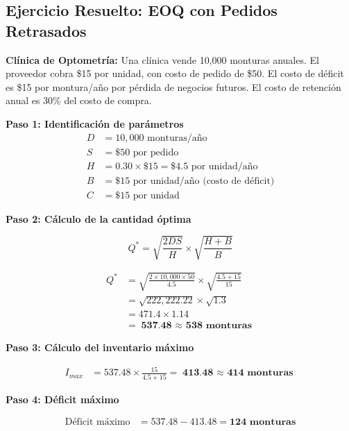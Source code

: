 \documentclass[12pt,a4paper]{book}
\begin{document}
	\subsection{Ejercicio Resuelto: EOQ con Pedidos Retrasados}
	
	\begin{tcolorbox}[enhanced,colback=naranjaclaro,colframe=naranjaacento,boxrule=2pt,arc=8pt,
		drop shadow,title={\bfseries\color{white} \faPuzzlePiece\ PROBLEMA}]
		
		\textbf{Clínica de Optometría:} Una clínica vende 10,000 monturas anuales. El proveedor cobra \$15 por unidad, con costo de pedido de \$50. El costo de déficit es \$15 por montura/año por pérdida de negocios futuros. El costo de retención anual es 30\% del costo de compra.
		
	\end{tcolorbox}
	
	\begin{tcolorbox}[enhanced,colback=azulclaro,colframe=azulprincipal,boxrule=2pt,arc=8pt,
		title={\bfseries\color{white} \faCalculator\ SOLUCIÓN PASO A PASO}]
		
		\textbf{Paso 1: Identificación de parámetros}
		\begin{align}
			D &= 10,000 \text{ monturas/año}\\
			S &= \$50 \text{ por pedido}\\
			H &= 0.30 \times \$15 = \$4.5 \text{ por unidad/año}\\
			B &= \$15 \text{ por unidad/año (costo de déficit)}\\
			C &= \$15 \text{ por unidad}
		\end{align}
		
		\textbf{Paso 2: Cálculo de la cantidad óptima}
		
		\begin{equation}
			\boxed{Q^* = \sqrt{\frac{2DS}{H}} \times \sqrt{\frac{H + B}{B}}}
		\end{equation}
		
		\begin{align}
			Q^* &= \sqrt{\frac{2 \times 10,000 \times 50}{4.5}} \times \sqrt{\frac{4.5 + 15}{15}}\\
			&= \sqrt{222,222.22} \times \sqrt{1.3}\\
			&= 471.4 \times 1.14\\
			&= \textbf{537.48 $\approx$ 538 monturas}
		\end{align}
		
		\textbf{Paso 3: Cálculo del inventario máximo}
		
		\begin{align}
			I_{max} &= 537.48 \times \frac{15}{4.5 + 15} = \textbf{413.48 $\approx$ 414 monturas}
		\end{align}
		
		\textbf{Paso 4: Déficit máximo}
		
		\begin{align}
			\text{Déficit máximo} &= 537.48 - 413.48 = \textbf{124 monturas}
		\end{align}
		
	\end{tcolorbox}
	
\end{document}
